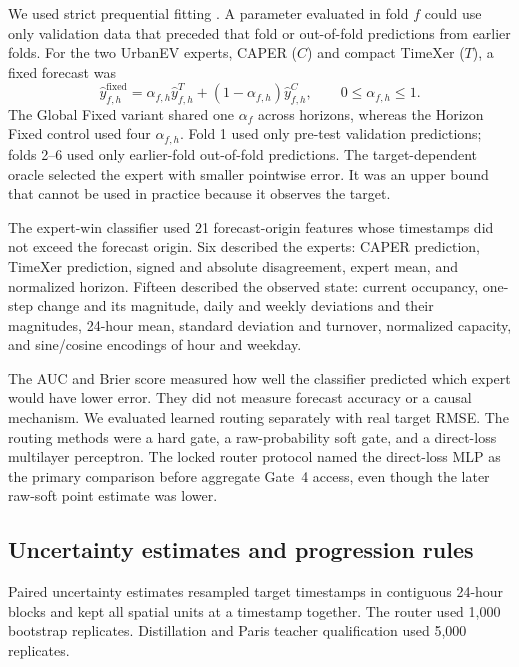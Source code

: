 We used strict prequential fitting \cite{dawid1984prequential,tashman2000oos}.  A parameter evaluated in fold $f$ could use only validation data that preceded that fold or out-of-fold predictions from earlier folds.  For the two UrbanEV experts, CAPER ($C$) and compact TimeXer ($T$), a fixed forecast was
\begin{equation}
    \widehat y_{f,h}^{\mathrm{fixed}}
    =\alpha_{f,h}\widehat y_{f,h}^{T}
    +(1-\alpha_{f,h})\widehat y_{f,h}^{C},
    \qquad 0\leq\alpha_{f,h}\leq 1.
    \label{eq:fixed-fusion}
\end{equation}
The Global Fixed variant shared one $\alpha_f$ across horizons, whereas the Horizon Fixed control used four $\alpha_{f,h}$.  Fold 1 used only pre-test validation predictions; folds 2--6 used only earlier-fold out-of-fold predictions.  The target-dependent oracle selected the expert with smaller pointwise error.  It was an upper bound that cannot be used in practice because it observes the target.

The expert-win classifier used 21 forecast-origin features whose timestamps did not exceed the forecast origin.  Six described the experts: CAPER prediction, TimeXer prediction, signed and absolute disagreement, expert mean, and normalized horizon.  Fifteen described the observed state: current occupancy, one-step change and its magnitude, daily and weekly deviations and their magnitudes, 24-hour mean, standard deviation and turnover, normalized capacity, and sine/cosine encodings of hour and weekday.

The AUC and Brier score measured how well the classifier predicted which expert would have lower error.  They did not measure forecast accuracy or a causal mechanism.  We evaluated learned routing separately with real target RMSE.  The routing methods were a hard gate, a raw-probability soft gate, and a direct-loss multilayer perceptron.  The locked router protocol named the direct-loss MLP as the primary comparison before aggregate Gate~4 access, even though the later raw-soft point estimate was lower.

\subsection{Uncertainty estimates and progression rules}
\label{sec:methods-gates}

Paired uncertainty estimates resampled target timestamps in contiguous 24-hour blocks and kept all spatial units at a timestamp together.  The router used 1,000 bootstrap replicates.  Distillation and Paris teacher qualification used 5,000 replicates.


